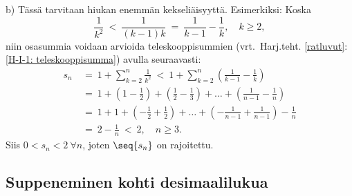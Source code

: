 b) Tässä tarvitaan hiukan enemmän kekseliäisyyttä. Esimerkiksi: Koska
\[
\frac{1}{k^2}\ <\ \frac{1}{(k-1)k}\ =\ \frac{1}{k-1} - \frac{1}{k}, \quad k \ge 2,
\]
niin osasummia voidaan arvioida teleskooppisummien 
(vrt.\ Harj.teht. \ref{ratluvut}:\ref{H-I-1: teleskooppisumma}) avulla seuraavasti:
\begin{align*}
s_n\ &=\ 1 + \sum_{k=2}^n \frac{1}{k^2}\ 
      <\ 1 + \sum_{k=2}^n \left( \frac{1}{k-1} - \frac{1}{k} \right) \\
     &=\ 1 + \left(1 - \frac{1}{2}\right) 
           + \left(\frac{1}{2} - \frac{1}{3}\right) + \ldots
           + \left(\frac{1}{n-1} - \frac{1}{n}\right)         \\
     &=\ 1 + 1 + \left(- \frac{1}{2} + \frac{1}{2}\right) + \ldots 
      + \left(- \frac{1}{n-1} + \frac{1}{n-1}\right) - \frac{1}{n} \\
     &=\ 2 - \frac{1}{n}\ <\ 2, \quad n \ge 3.
\end{align*}
Siis $0 < s_n < 2\ \forall n$, joten $\seq{s_n}$ on rajoitettu. \loppu

\subsection{Suppeneminen kohti desimaalilukua}

